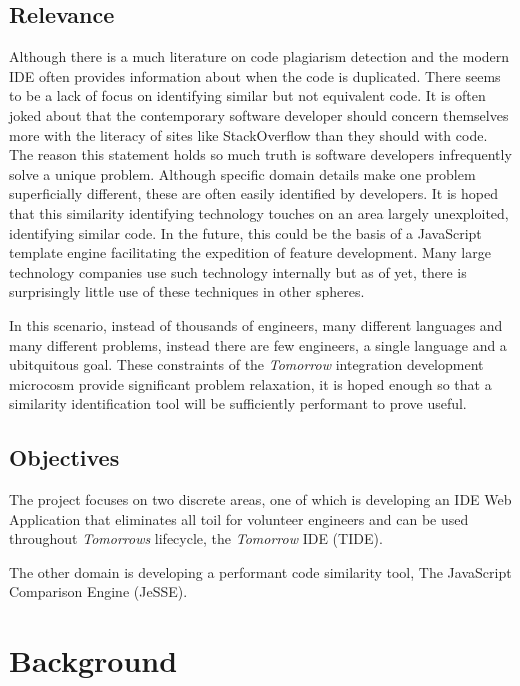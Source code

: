\documentclass[jou,apacite]{apa6}
\begin{document}
\subsection{Relevance}
Although there is a much literature on code plagiarism detection and the modern IDE often provides information about when the code is duplicated. There seems to be a lack of focus on identifying similar but not equivalent code. It is often joked about that the contemporary software developer should concern themselves more with the literacy of sites like StackOverflow than they should with code. The reason this statement holds so much truth is software developers infrequently solve a unique problem. Although specific domain details make one problem superficially different, these are often easily identified by developers. It is hoped that this similarity identifying technology touches on an area largely unexploited, identifying similar code. In the future, this could be the basis of a JavaScript template engine facilitating the expedition of feature development. Many large technology companies use such technology internally but as of yet, there is surprisingly little use of these techniques in other spheres.

In this scenario, instead of thousands of engineers, many different languages and many different problems, instead there are few engineers, a single language and a ubitquitous goal. These constraints of the \textit{Tomorrow} integration development microcosm provide significant problem relaxation, it is hoped enough so that a similarity identification tool will be sufficiently performant to prove useful.

\subsection{Objectives}
The project focuses on two discrete areas, one
 of which is developing an IDE Web Application that eliminates all toil for volunteer engineers and can be used throughout \textit{Tomorrow\textquotesingle s }   lifecycle, the \textit{Tomorrow} IDE (TIDE).

The other domain is developing a performant code similarity tool, The JavaScript Comparison Engine (JeSSE).
\clearpage

\section{Background}
\end{document}
